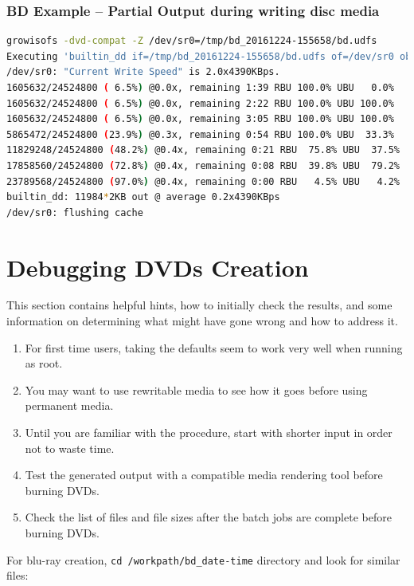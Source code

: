\subsubsection*{BD Example – Partial Output during writing disc media}
\label{ssub:bd_example_partial_output_writing}

\begin{lstlisting}[language=bash,numbers=none]
growisofs -dvd-compat -Z /dev/sr0=/tmp/bd_20161224-155658/bd.udfs
Executing 'builtin_dd if=/tmp/bd_20161224-155658/bd.udfs of=/dev/sr0 obs=32k seek=0'
/dev/sr0: "Current Write Speed" is 2.0x4390KBps.
1605632/24524800 ( 6.5%) @0.0x, remaining 1:39 RBU 100.0% UBU   0.0%
1605632/24524800 ( 6.5%) @0.0x, remaining 2:22 RBU 100.0% UBU 100.0%
1605632/24524800 ( 6.5%) @0.0x, remaining 3:05 RBU 100.0% UBU 100.0%
5865472/24524800 (23.9%) @0.3x, remaining 0:54 RBU 100.0% UBU  33.3%
11829248/24524800 (48.2%) @0.4x, remaining 0:21 RBU  75.8% UBU  37.5%
17858560/24524800 (72.8%) @0.4x, remaining 0:08 RBU  39.8% UBU  79.2%
23789568/24524800 (97.0%) @0.4x, remaining 0:00 RBU   4.5% UBU   4.2%
builtin_dd: 11984*2KB out @ average 0.2x4390KBps
/dev/sr0: flushing cache
\end{lstlisting}

\section{Debugging DVDs Creation}%
\label{sec:debugging_dvd_creation}

This section contains helpful hints, how to initially check the results, and some information on determining what might have gone wrong and how to address it.

\begin{enumerate}
    \item For first time users, taking the defaults seem to work very well when running as root.
    \item You may want to use rewritable media to see how it goes before using permanent media.
    \item Until you are familiar with the procedure, start with shorter input in order not to waste time.
    \item Test the generated output with a compatible media rendering tool before burning DVDs.
    \item Check the list of files and file sizes after the batch jobs are complete before burning DVDs.
\end{enumerate}

For blu-ray creation, \texttt{cd /workpath/bd\_date-time} directory and look for similar files:

